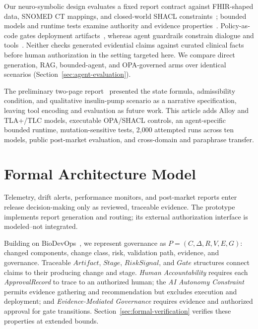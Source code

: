 \documentclass[journal,twoside,web]{ieeecolor}
\begin{document}
Our neuro-symbolic design evaluates a fixed report contract against FHIR-shaped data, SNOMED CT mappings, and closed-world SHACL constraints~\cite{liu_snomed_kg,fhir,snomed,shacl,owl2}; bounded models and runtime tests examine authority and evidence properties~\cite{leucker_runtime}. Policy-as-code gates deployment artifacts~\cite{opa_cicd,github_environments,toivakka_regops}, whereas agent guardrails constrain dialogue and tools~\cite{nemo_guardrails,agentspec}. Neither checks generated evidential claims against curated clinical facts before human authorization in the setting targeted here. We compare direct generation, RAG, bounded-agent, and OPA-governed arms over identical scenarios (Section~\ref{sec:agent-evaluation}).

The preliminary two-page report~\cite{mirto_biodevops_phdforum} presented the state formula, admissibility condition, and qualitative insulin-pump scenario as a narrative specification, leaving tool encoding and evaluation as future work. This article adds Alloy and TLA+/TLC models, executable OPA/SHACL controls, an agent-specific bounded runtime, mutation-sensitive tests, 2,000 attempted runs across ten models, public post-market evaluation, and cross-domain and paraphrase transfer.

\section{Formal Architecture Model}
\label{sec:architecture}

Telemetry, drift alerts, performance monitors, and post-market reports enter release decision-making only as reviewed, traceable evidence. The prototype implements report generation and routing; its external authorization interface is modeled--not integrated.

Building on BioDevOps~\cite{mirto_biodevops_phdforum}, we represent governance as $P=(C,\Delta,R,V,E,G)$: changed components, change class, risk, validation path, evidence, and governance. Traceable $Artifact$, $Stage$, $RiskSignal$, and $Gate$ structures connect claims to their producing change and stage. \textit{Human Accountability} requires each \textit{ApprovalRecord} to trace to an authorized human; the \textit{AI Autonomy Constraint} permits evidence gathering and recommendation but excludes execution and deployment; and \textit{Evidence-Mediated Governance} requires evidence and authorized approval for gate transitions. Section~\ref{sec:formal-verification} verifies these properties at extended bounds.
\end{document}
